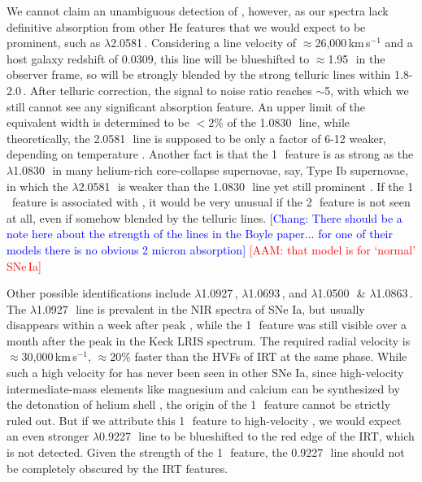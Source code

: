 \documentclass[twocolumn]{aastex631}
\newcommand{\adam}[1]{\textcolor{red}{[AAM: #1]}}
\newcommand{\chang}[1]{\textcolor{blue}{[Chang: #1]}}
\begin{document}
We cannot claim an unambiguous detection of , however, as our spectra lack definitive absorption from other He features that we would expect to be prominent, such as  $\lambda$2.0581\,\micron. Considering a line velocity of $\approx$26,000\,km\,s$^{-1}$ and a host galaxy redshift of 0.0309, this line will be blueshifted to $\approx$1.95\,\micron\ in the observer frame, so will be strongly blended by the strong telluric lines within 1.8-2.0\,\micron. After telluric correction, the signal to noise ratio reaches $\sim$5, with which we still cannot see any significant absorption feature. An upper limit of the equivalent width is determined to be $<$$2\%$ of the 1.0830\,\micron\ line, while theoretically, the 2.0581\,\micron\ line is supposed to be only a factor of 6-12 weaker, depending on temperature \citep{Marion2009_NIR}. Another fact is that the 1\,\micron\ feature is as strong as the  $\lambda$1.0830\,\micron\ in many helium-rich core-collapse supernovae, say, Type Ib supernovae, in which the  $\lambda$2.0581\,\micron\ is weaker than the 1.0830\,\micron\ line yet still prominent \citep{CSP_Ibc_2022}. If the 1\,\micron\ feature is associated with , it would be very unusual if the 2\,\micron\ feature is not seen at all, even if somehow blended by the telluric lines. \chang{There should be a note here about the strength of the lines in the Boyle paper... for one of their models there is no obvious 2 micron absorption} \adam{that model is for `normal' SNe\,Ia}

Other possible identifications include  $\lambda$1.0927\,\micron,  $\lambda$1.0693\,\micron, and  $\lambda$1.0500\,\micron\ \& $\lambda$1.0863\,\micron. The  $\lambda$1.0927\,\micron\ line is prevalent in the NIR spectra of SNe Ia, but usually disappears within a week after peak \citep{Marion2009_NIR}, while the 1\,\micron\ feature was still visible over a month after the peak in the Keck LRIS spectrum. The required radial velocity is $\approx$30,000\,km\,s$^{-1}$, $\approx$20\% faster than the HVFs of  IRT at the same phase. While such a high velocity for  has never been seen in other SNe Ia, since high-velocity intermediate-mass elements like magnesium and calcium can be synthesized by the detonation of helium shell \citep{Shen_DD_2014}, the  origin of the 1\,\micron\ feature cannot be strictly ruled out. But if we attribute this 1\,\micron\ feature to high-velocity , we would expect an even stronger $\lambda$0.9227\,\micron\ line to be blueshifted to the red edge of the  IRT, which is not detected. Given the strength of the 1\,\micron\ feature, the 0.9227\,\micron\ line should not be completely obscured by the  IRT features. 
\end{document}
